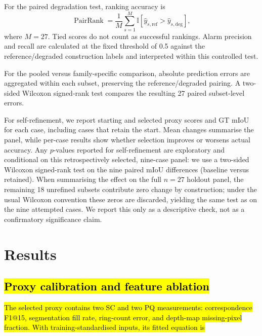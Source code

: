 \documentclass[a4paper,fleqn]{cas-dc}
\begin{document}
{For the paired degradation test, ranking accuracy is
\begin{equation}
\operatorname{PairRank}
=
\frac{1}{M}\sum_{s=1}^{M}
\mathbb{I}
\left[
\hat{y}_{s,\mathrm{ref}}>
\hat{y}_{s,\mathrm{deg}}
\right],
\end{equation}
where $M=27$. Tied scores do not count as successful rankings. Alarm precision and recall are calculated at the fixed threshold of 0.5 against the reference/degraded construction labels and interpreted within this controlled test.

For the pooled versus family-specific comparison, absolute prediction errors are aggregated within each subset, preserving the reference/degraded pairing. A two-sided Wilcoxon signed-rank test compares the resulting 27 paired subset-level errors.

For self-refinement, we report starting and selected proxy scores and GT mIoU for each case, including cases that retain the start. Mean changes summarise the panel, while per-case results show whether selection improves or worsens actual accuracy. Any $p$-values reported for self-refinement are exploratory and conditional on this retrospectively selected, nine-case panel: we use a two-sided Wilcoxon signed-rank test on the nine paired mIoU differences (baseline versus retained). When summarising the effect on the full $n{=}27$ holdout panel, the remaining 18 unrefined subsets contribute zero change by construction; under the usual Wilcoxon convention these zeros are discarded, yielding the same test as on the nine attempted cases. We report this only as a descriptive check, not as a confirmatory significance claim.

\section{Results}\label{sec:results}

\subsection{\hl{Proxy calibration and feature ablation}}
\label{sec:main-results}\label{sec:proxy-ablation-results}

\hl{The selected proxy contains two SC and two PQ measurements: correspondence F1@15, segmentation fill rate, ring-count error, and depth-map missing-pixel fraction. With training-standardised inputs, its fitted equation is}

}
\end{document}
